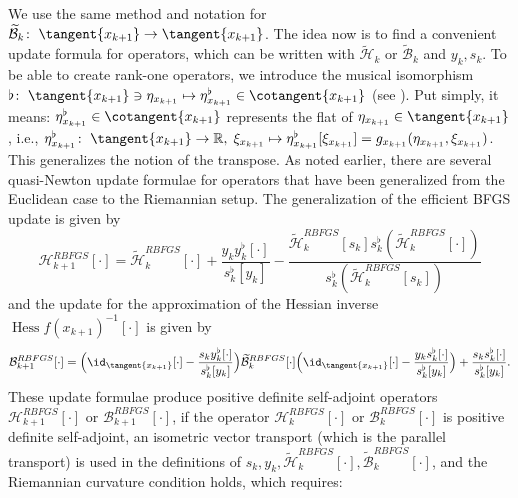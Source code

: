 We use the same method and notation for $\widetilde{\mathcal{B}}_k \colon \; \tangent{x_{k+1}} \to \tangent{x_{k+1}}$. The idea now is to find a convenient update formula for operators, which can be written with $\widetilde{\mathcal{H}}_k$ or $\widetilde{\mathcal{B}}_k$ and $y_k,s_k$. To be able to create rank-one operators, we introduce the musical isomorphism $\flat \colon \; \tangent{x_{k+1}} \ni \eta_{x_{k+1}} \mapsto \eta^{\flat}_{x_{k+1}} \in \cotangent{x_{k+1}}$ (see \cite[p.~6]{BergmannHerzogLouzeiroSilvaTenbrinckVidalNunez:2020:1}). Put simply, it means: $\eta^{\flat}_{x_{k+1}} \in \cotangent{x_{k+1}}$ represents the flat of $\eta_{x_{k+1}} \in \tangent{x_{k+1}}$, i.e., $\eta^{\flat}_{x_{k+1}} \colon \; \tangent{x_{k+1}} \to \mathbb{R}, \;  \xi_{x_{k+1}} \mapsto \eta^{\flat}_{x_{k+1}}[\xi_{x_{k+1}}] = g_{x_{k+1}} (\eta_{x_{k+1}}, \xi_{x_{k+1}})$. This generalizes the notion of the transpose. As noted earlier, there are several quasi-Newton update formulae for operators that have been generalized from the Euclidean case to the Riemannian setup. The generalization of the efficient BFGS update is given by
\begin{equation}\label{directRiemannianBFGSFormula}
    \mathcal{H}^{RBFGS}_{k+1} [\cdot] = \widetilde{\mathcal{H}}^{RBFGS}_k [\cdot] + \frac{y_k y^{\flat}_k[\cdot]}{s^{\flat}_k [y_k]} - \frac{\widetilde{\mathcal{H}}^{RBFGS}_k [s_k] s^{\flat}_k (\widetilde{\mathcal{H}}^{RBFGS}_k [\cdot])}{s^{\flat}_k (\widetilde{\mathcal{H}}^{RBFGS}_k [s_k])}
\end{equation}
and the update for the approximation of the Hessian inverse ${\operatorname{Hess} f(x_{k+1})}^{-1} [\cdot]$ is given by
\begin{equation}\label{RiemannianInverseBFGSFormula}
        \mathcal{B}^{RBFGS}_{k+1} [\cdot] = \Big{(} \id_{\tangent{x_{k+1}}}[\cdot] - \frac{s_k y^{\flat}_k [\cdot]}{s^{\flat}_k [y_k]} \Big{)} \widetilde{\mathcal{B}}^{RBFGS}_k [\cdot] \Big{(} \id_{\tangent{x_{k+1}}}[\cdot] - \frac{y_k s^{\flat}_k [\cdot]}{s^{\flat}_k [y_k]} \Big{)} + \frac{s_k s^{\flat}_k [\cdot]}{s^{\flat}_k [y_k]}.
\end{equation}
These update formulae produce positive definite self-adjoint operators $\mathcal{H}^{RBFGS}_{k+1} [\cdot]$ or $\mathcal{B}^{RBFGS}_{k+1} [\cdot]$, if the operator $\mathcal{H}^{RBFGS}_k [\cdot]$ or $\mathcal{B}^{RBFGS}_k [\cdot]$ is positive definite self-adjoint, an isometric vector transport (which is the parallel transport) is used in the definitions of $s_k, y_k, \widetilde{\mathcal{H}}^{RBFGS}_k [\cdot], \widetilde{\mathcal{B}}^{RBFGS}_k [\cdot]$, and the Riemannian curvature condition holds, which requires:

